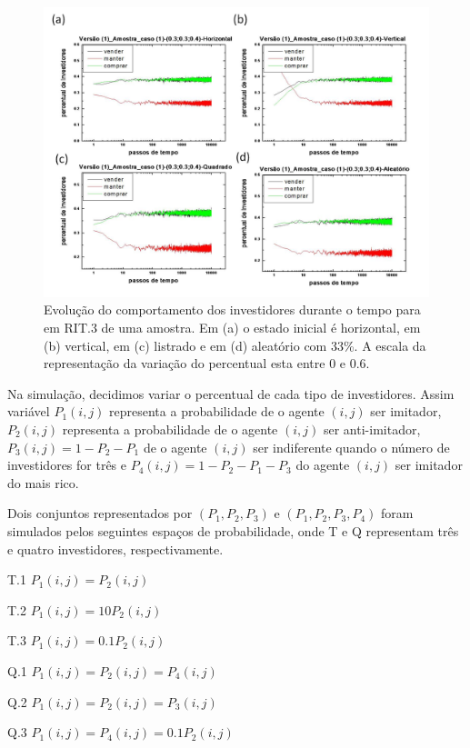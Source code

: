 \documentclass[brazil,ruledheader]{abnt}
\begin{document}
\begin{figure}[!h]
\centering
\includegraphics[width=0.8\linewidth]{Figuras/1.jpg}
 \caption[ Evolução do comportamento dos investidores em RI para 4 entradas
diferentes] {Evolução do comportamento dos investidores durante o tempo para
em RIT.3  de uma amostra. Em (a) o estado inicial é
horizontal, em (b) vertical, em (c) listrado e em (d) aleatório com 33\%.
A escala da representação da variação do percentual esta entre 0 e 0.6.}
\label{fig:evolucao-comportamento}
\end{figure}

Na simulação, decidimos variar o percentual de cada tipo de investidores. Assim
variável $P_1(i,j)$ representa a probabilidade de o agente $(i,j)$ ser imitador,
$P_2(i,j)$ representa a probabilidade de o agente $(i,j)$  ser anti-imitador,
$P_3(i,j)= 1-P_2-P_1$ de o agente $(i,j)$ ser indiferente quando o
número de investidores for três e  $P_4(i,j)=1-P_2-P_1-P_3$ do
agente $(i,j)$ ser imitador do mais rico.

Dois conjuntos representados por $(P_1,P_2,P_3)$ e $(P_1,P_2,P_3,P_4)$
foram
simulados pelos seguintes espaços de probabilidade, onde T e Q representam três
 e quatro investidores, respectivamente.

T.1 $P_1(i,j)=P_2(i,j)$ 

T.2 $P_1(i,j)=10P_2(i,j)$ 

T.3 $P_1(i,j)=0.1P_2(i,j)$ 

Q.1 $P_1(i,j)=P_2(i,j)=P_4(i,j)$ 

Q.2 $P_1(i,j)=P_2(i,j)=P_3(i,j)$ 

Q.3 $P_1(i,j)=P_4(i,j)=0.1P_2(i,j)$ 
\end{document}

